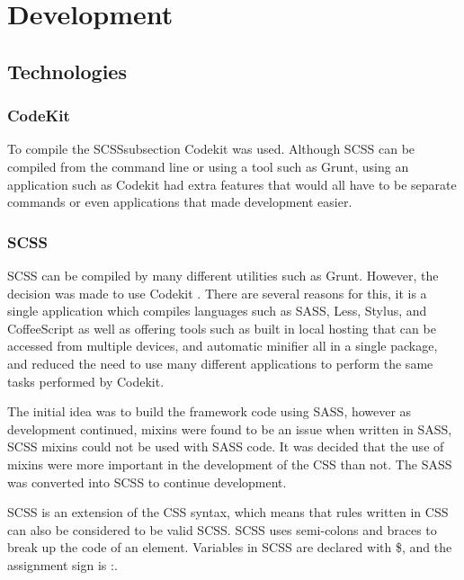 \chapter*{Development}
\section*{Technologies}

\subsection*{CodeKit}

To compile the \gls{SCSS}subsection Codekit \citep{CODEKIT17} was used. Although \gls{SCSS} can be compiled from the command line or using a tool such as Grunt, using an application such as Codekit had extra features that would all have to be separate commands or even applications that made development easier. 

\subsection*{SCSS}

\gls{SCSS} can be compiled by many different utilities such as Grunt. However, the decision was made to use Codekit \citep{CODEKIT17}. There are several reasons for this, it is a single application which compiles languages such as SASS, Less, Stylus, and CoffeeScript as well as offering tools such as built in local hosting that can be accessed from multiple devices, and automatic minifier all in a single package, and reduced the need to use many different applications to perform the same tasks performed by Codekit.
 
 The initial idea was to build the framework code using \gls{SASS}, however as development continued, \gls{mixins} were found to be an issue when written in \gls{SASS}, \gls{SCSS} \gls{mixins} could not be used with \gls{SASS} code. It was decided that the use of \gls{mixins} were more important in the development of the \gls{CSS} than not. The \gls{SASS} was converted into \gls{SCSS} to continue development. 
 
\gls{SCSS} is an extension of the \gls{CSS} syntax, which means that rules written in \gls{CSS} can also be considered to be valid \gls{SCSS}. \gls{SCSS} uses semi-colons and braces to break up the code of an element. Variables in \gls{SCSS} are declared with \$, and the assignment sign is :. 


